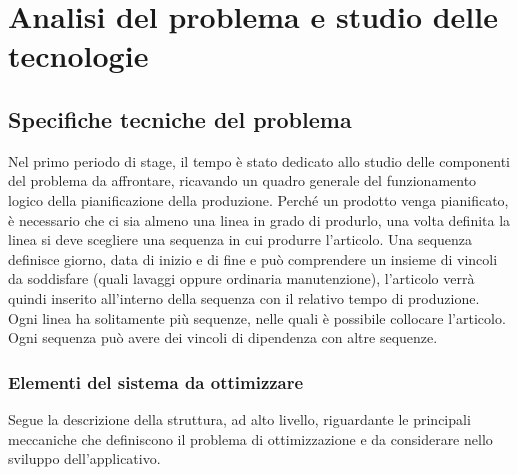 
\chapter{Analisi del problema e studio delle tecnologie}
\label{cap:progetto-stage}

\section{Specifiche tecniche del problema}

Nel primo periodo di stage, il tempo è stato dedicato allo studio delle componenti del problema da affrontare, ricavando un quadro generale del
funzionamento logico della pianificazione della produzione. 
Perché un prodotto venga pianificato, è necessario che ci sia almeno una linea in grado di produrlo, una volta definita la linea si deve scegliere una sequenza in 
cui produrre l'articolo. Una sequenza definisce giorno, data di inizio e di fine e può comprendere un insieme di vincoli da soddisfare
(quali lavaggi oppure ordinaria manutenzione), l'articolo verrà quindi inserito all'interno della sequenza con il relativo tempo di produzione.
Ogni linea ha solitamente più sequenze, nelle quali è possibile collocare l'articolo. Ogni sequenza può avere dei vincoli di dipendenza con altre sequenze.


\subsection{Elementi del sistema da ottimizzare}
Segue la descrizione della struttura, ad alto livello, riguardante le principali meccaniche che definiscono il problema di ottimizzazione e da considerare nello sviluppo dell'applicativo.

